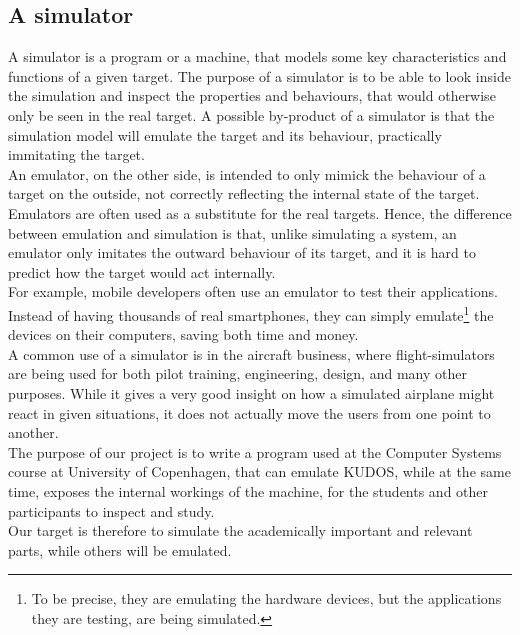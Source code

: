 \subsection{A simulator}
A simulator is a program or a machine, that models some key characteristics
and functions of a given target.  The purpose of a
simulator is to be able to look inside the simulation and inspect the properties
and behaviours, that would otherwise only be seen in the real target.
A possible by-product of a simulator is that the simulation model will emulate
the target and its behaviour, practically immitating the target.\\
An emulator, on the other side, is intended to only mimick the behaviour of
a target on the outside, not correctly reflecting the internal state of the target.
Emulators are often used as a substitute for the real targets.
Hence, the difference between emulation and simulation is that, unlike simulating a system,
an emulator only imitates the outward behaviour of its target, and it is hard
to predict how the target would act internally.\\
For example, mobile developers often use an emulator to test their
applications.
Instead of having thousands of real smartphones, they can simply emulate\footnote{
To be precise, they are emulating the hardware devices, but the applications they
are testing, are being simulated.}
the devices on their computers, saving both time and money.\\
A common use of a simulator is in the aircraft business, where flight-simulators
are being used for both pilot training, engineering, design, and many other
purposes. While it gives a very good insight on how a simulated airplane might
react in given situations, it does not actually move the users from one point
to another.\\
The purpose of our project is to write a program used at the Computer Systems
course at University of Copenhagen, that can emulate KUDOS, while at the same
time, exposes the internal workings of the machine, for the students and
other participants to inspect and study.\\
Our target is therefore to simulate the academically important and relevant
parts, while others will be emulated.

